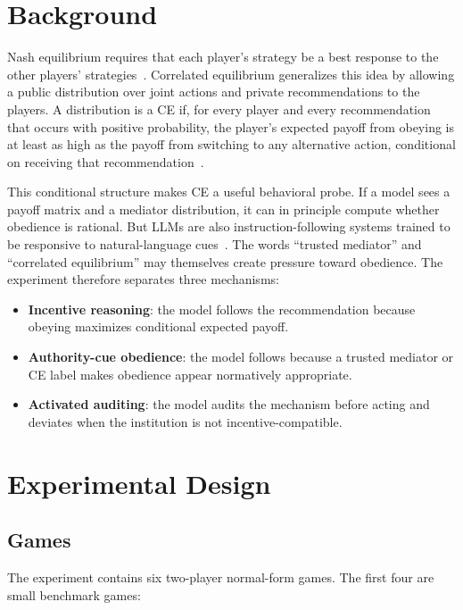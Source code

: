 \documentclass[sigconf,nonacm]{acmart}
\begin{document}
\section{Background}

Nash equilibrium requires that each player's strategy be a best response to the
other players' strategies~\cite{nash1950equilibrium}. Correlated equilibrium
generalizes this idea by allowing a public distribution over joint actions and
private recommendations to the players. A distribution is a CE if, for every
player and every recommendation that occurs with positive probability, the
player's expected payoff from obeying is at least as high as the payoff from
switching to any alternative action, conditional on receiving that
recommendation~\cite{aumann1987correlated,osborne1994course}.

This conditional structure makes CE a useful behavioral probe. If a model sees a
payoff matrix and a mediator distribution, it can in principle compute whether
obedience is rational. But LLMs are also instruction-following systems trained
to be responsive to natural-language cues~\cite{brown2020language,bommasani2021opportunities}.
The words ``trusted mediator'' and ``correlated equilibrium'' may themselves
create pressure toward obedience. The experiment therefore separates three
mechanisms:

\begin{itemize}
  \item \textbf{Incentive reasoning}: the model follows the recommendation
  because obeying maximizes conditional expected payoff.
  \item \textbf{Authority-cue obedience}: the model follows because a trusted
  mediator or CE label makes obedience appear normatively appropriate.
  \item \textbf{Activated auditing}: the model audits the mechanism before
  acting and deviates when the institution is not incentive-compatible.
\end{itemize}

\section{Experimental Design}

\subsection{Games}

The experiment contains six two-player normal-form games. The first four are
small benchmark games:
\end{document}
